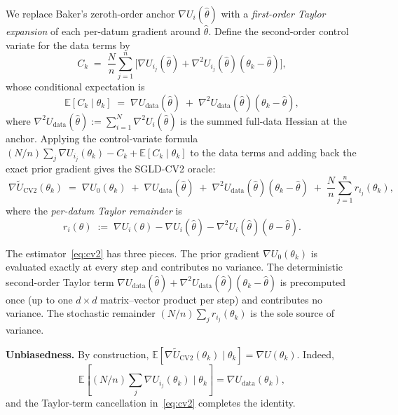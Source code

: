 We replace Baker's zeroth-order anchor $\nabla U_i(\hat\theta)$ with a \emph{first-order Taylor expansion} of each per-datum gradient around $\hat\theta$. Define the second-order control variate for the data terms by
\begin{equation}
  C_k \;=\; \frac{N}{n}\sum_{j=1}^n\!\bigl[\nabla U_{i_j}(\hat\theta) + \nabla^2 U_{i_j}(\hat\theta)(\theta_k-\hat\theta)\bigr],
\end{equation}
whose conditional expectation is
\begin{equation}
  \mathbb E[C_k\mid\theta_k] \;=\; \nabla U_{\text{data}}(\hat\theta) \;+\; \nabla^2 U_{\text{data}}(\hat\theta)(\theta_k-\hat\theta),
\end{equation}
where $\nabla^2 U_{\text{data}}(\hat\theta):=\sum_{i=1}^N\nabla^2 U_i(\hat\theta)$ is the summed full-data Hessian at the anchor. Applying the control-variate formula $(N/n)\sum_j\nabla U_{i_j}(\theta_k)-C_k+\mathbb E[C_k\mid\theta_k]$ to the data terms and adding back the exact prior gradient gives the SGLD-CV2 oracle:
\begin{equation}
  \boxed{\;\nabla\tilde U_{\mathrm{CV2}}(\theta_k) \;=\; \nabla U_0(\theta_k) \;+\; \nabla U_{\text{data}}(\hat\theta) \;+\; \nabla^2 U_{\text{data}}(\hat\theta)(\theta_k-\hat\theta) \;+\; \frac{N}{n}\sum_{j=1}^n r_{i_j}(\theta_k),\;}
  \label{eq:cv2}
\end{equation}
where the \emph{per-datum Taylor remainder} is
\begin{equation}
  r_i(\theta) \;:=\; \nabla U_i(\theta) - \nabla U_i(\hat\theta) - \nabla^2 U_i(\hat\theta)(\theta-\hat\theta).
  \label{eq:remainder}
\end{equation}

The estimator~\eqref{eq:cv2} has three pieces. The prior gradient $\nabla U_0(\theta_k)$ is evaluated exactly at every step and contributes no variance. The deterministic second-order Taylor term $\nabla U_{\text{data}}(\hat\theta)+\nabla^2 U_{\text{data}}(\hat\theta)(\theta_k-\hat\theta)$ is precomputed once (up to one $d\times d$ matrix--vector product per step) and contributes no variance. The stochastic remainder $(N/n)\sum_j r_{i_j}(\theta_k)$ is the sole source of variance.

\textbf{Unbiasedness.} By construction, $\mathbb E[\nabla\tilde U_{\mathrm{CV2}}(\theta_k)\mid\theta_k]=\nabla U(\theta_k)$. Indeed, \[\mathbb E[(N/n)\sum_j\nabla U_{i_j}(\theta_k)\mid\theta_k]=\nabla U_{\text{data}}(\theta_k),\] and the Taylor-term cancellation in~\eqref{eq:cv2} completes the identity.

